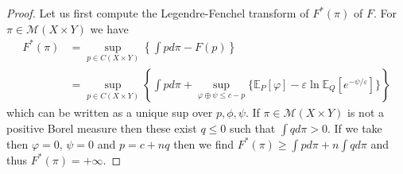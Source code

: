\documentclass{amsart}
\theoremstyle{definition}
\theoremstyle{remark}
\numberwithin{equation}{section}
\begin{document}
\begin{proof} 
Let us first compute the Legendre-Fenchel  transform of $F^*(\pi)$ of $F$.  
For $\pi \in \mathcal{M}(X \times Y)$ we have 
\begin{equation}
\begin{aligned}
F^*(\pi) & = \sup_{p\in C(X \times Y)} \left\{\int p d\pi - F(p)\right\}  \\
&= \sup_{p \in C(X \times Y)} \left\{ 
\int p d\pi  + \sup_{\varphi \oplus \psi\le c-p} 
\{ 
\mathbb{E}_P[\varphi] - \varepsilon \ln \mathbb{E}_Q[e^{-\psi/\varepsilon}]
\} 
\right\} 
\end{aligned}
\end{equation}
which can be written as a unique sup over $p, \phi, \psi$.  If $\pi \in \mathcal{M}(X \times Y)$ is not a positive Borel measure then these exist $q\le 0$ such that $\int q d\pi >0 $.   If we take then $\varphi=0$, $\psi=0$ and $p = c + nq$ then we find 
$F^*(\pi) \ge \int p d\pi + n \int q d\pi$ and thus $F^*(\pi)=+\infty$.  


\end{proof}
\end{document}
